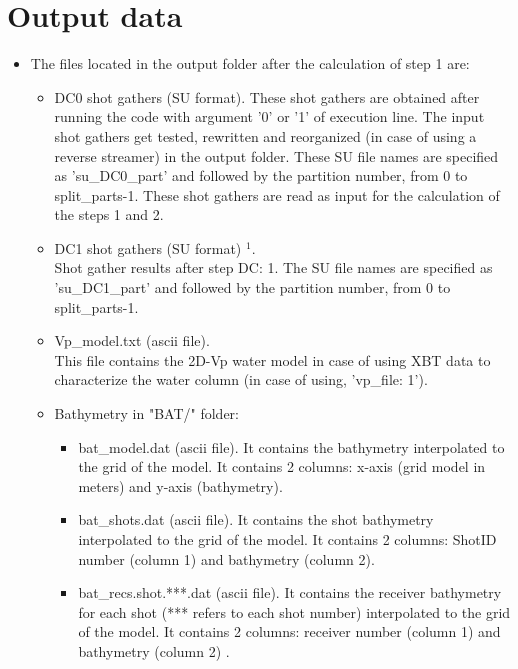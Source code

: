 \documentclass[11pt, oneside]{article}   	%
\begin{document}
\section{Output data}\label{sec5}

\begin{itemize}

\item The files located in the output folder after the calculation of step 1 are:

\begin{itemize}
 
 \item DC0 shot gathers (SU format). These shot gathers are obtained after running the code with argument '0' or '1' of execution line. The input shot gathers get tested, rewritten and reorganized (in case of using a reverse streamer) in the output folder. These SU file names are specified as 'su\_DC0\_part' and followed by the partition number, from 0 to split\_parts-1. These shot gathers are read as input for the calculation of the steps 1 and 2.
  
 \item DC1 shot gathers (SU format) $^{1}$.\\
 Shot gather results after step DC: 1. The SU file names are specified as 'su\_DC1\_part' and followed by the partition number, from 0 to split\_parts-1.

 \item Vp\_model.txt (ascii file).\\
 This file contains the 2D-Vp water model in case of using XBT data to characterize the water column (in case of using, 'vp\_file: 1').
 
 \item Bathymetry in "BAT/" folder:
 \begin{itemize}
 \item   bat\_model.dat (ascii file). It contains the bathymetry interpolated to the grid of the model. It contains 2 columns: x-axis (grid model in meters) and y-axis (bathymetry).
 \item bat\_shots.dat (ascii file). It contains the shot bathymetry interpolated to the grid of the model. It contains 2 columns: ShotID number (column 1) and bathymetry (column 2).
 \item bat\_recs.shot.***.dat (ascii file). It contains the receiver bathymetry for each shot (*** refers to each shot number) interpolated to the grid of the model. It contains 2 columns: receiver number (column 1) and bathymetry (column 2) .
\end{itemize}


\end{itemize}
\end{itemize}
\end{document}
